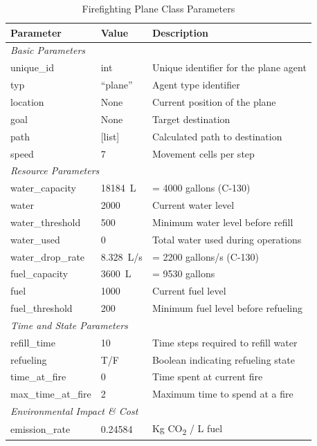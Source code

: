 \documentclass[11pt, a4paper]{article}
\begin{document}
\begin{table}[H]
\centering
\caption{Firefighting Plane Class Parameters}
\label{tab:plane_parameters}
\small
\begin{tabular}{@{}p{2.5cm}p{1.5cm}p{6.5cm}@{}}
\toprule
\textbf{Parameter} & \textbf{Value} & \textbf{Description} \\
\midrule
\multicolumn{3}{l}{\textit{Basic Parameters}} \\
unique\_id & int & Unique identifier for the plane agent \\
typ & ``plane'' & Agent type identifier \\
location & None & Current position of the plane \\
goal & None & Target destination \\
path & [list] & Calculated path to destination \\
speed & 7 & Movement cells per step \\
\midrule
\multicolumn{3}{l}{\textit{Resource Parameters}} \\
water\_capacity & \SI{18184}{\liter} & = 4000 gallons (C-130) \citep{LockheedSuperHercules} \\
water & 2000 & Current water level \\
water\_threshold & 500 & Minimum water level before refill \\
water\_used & 0 & Total water used during operations \\
water\_drop\_rate & \SI{8.328}{\liter}/s & = 2200 gallons/s (C-130) \\
fuel\_capacity & \SI{3600}{\liter} & = 9530 gallons \citep{LockheedC130Hercules2022}\\
fuel & 1000 & Current fuel level \\
fuel\_threshold & 200 & Minimum fuel level before refueling\\
\midrule
\multicolumn{3}{l}{\textit{Time and State Parameters}} \\
refill\_time & 10 & Time steps required to refill water \\
refueling & T/F & Boolean indicating refueling state\\
time\_at\_fire & 0 & Time spent at current fire \\
max\_time\_at\_fire & 2 & Maximum time to spend at a fire \\
\midrule
\multicolumn{3}{l}{\textit{Environmental Impact \& Cost}} \\
emission\_rate & 0.24584 & Kg CO\textsubscript{2} / L fuel \citep{spicerRapidMeasurementEmissions2009} \\ 

\end{tabular}
\end{table}
\end{document}

